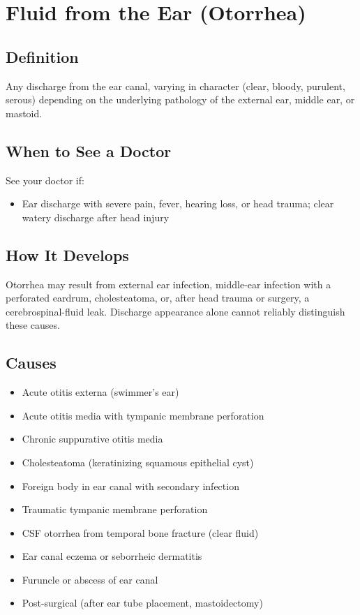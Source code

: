 \chapter{Fluid from the Ear (Otorrhea)}

\section*{Definition}
Any discharge from the ear canal, varying in character (clear, bloody, purulent, serous) depending on the underlying pathology of the external ear, middle ear, or mastoid.

\section*{When to See a Doctor}
See your doctor if:
\begin{itemize}
  \item Ear discharge with severe pain, fever, hearing loss, or head trauma; clear watery discharge after head injury
\end{itemize}

\section*{How It Develops}
Otorrhea may result from external ear infection, middle-ear infection with a perforated eardrum, cholesteatoma, or, after head trauma or surgery, a cerebrospinal-fluid leak. Discharge appearance alone cannot reliably distinguish these causes.

\section*{Causes}
\begin{itemize}
  \item Acute otitis externa (swimmer's ear)
  \item Acute otitis media with tympanic membrane perforation
  \item Chronic suppurative otitis media
  \item Cholesteatoma (keratinizing squamous epithelial cyst)
  \item Foreign body in ear canal with secondary infection
  \item Traumatic tympanic membrane perforation
  \item CSF otorrhea from temporal bone fracture (clear fluid)
  \item Ear canal eczema or seborrheic dermatitis
  \item Furuncle or abscess of ear canal
  \item Post-surgical (after ear tube placement, mastoidectomy)
\end{itemize}

